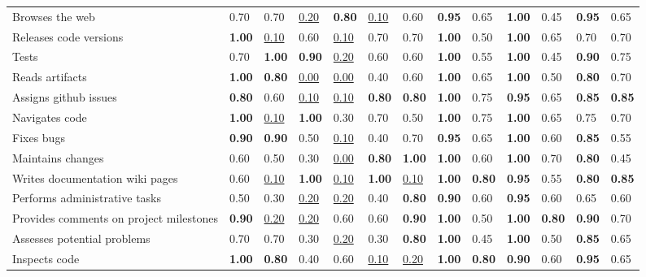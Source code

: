 \begin{tabular}{lllllllllllll}
Browses the web & 0.70 & 0.70 & \underline{0.20} & \textbf{0.80} & \underline{0.10} & 0.60 & \textbf{0.95} & 0.65 & \textbf{1.00} & 0.45 & \textbf{0.95} & 0.65 \\
Releases code versions & \textbf{1.00} & \underline{0.10} & 0.60 & \underline{0.10} & 0.70 & 0.70 & \textbf{1.00} & 0.50 & \textbf{1.00} & 0.65 & 0.70 & 0.70 \\
Tests & 0.70 & \textbf{1.00} & \textbf{0.90} & \underline{0.20} & 0.60 & 0.60 & \textbf{1.00} & 0.55 & \textbf{1.00} & 0.45 & \textbf{0.90} & 0.75 \\
Reads artifacts & \textbf{1.00} & \textbf{0.80} & \underline{0.00} & \underline{0.00} & 0.40 & 0.60 & \textbf{1.00} & 0.65 & \textbf{1.00} & 0.50 & \textbf{0.80} & 0.70 \\
Assigns github issues & \textbf{0.80} & 0.60 & \underline{0.10} & \underline{0.10} & \textbf{0.80} & \textbf{0.80} & \textbf{1.00} & 0.75 & \textbf{0.95} & 0.65 & \textbf{0.85} & \textbf{0.85} \\
Navigates code & \textbf{1.00} & \underline{0.10} & \textbf{1.00} & 0.30 & 0.70 & 0.50 & \textbf{1.00} & 0.75 & \textbf{1.00} & 0.65 & 0.75 & 0.70 \\
Fixes bugs & \textbf{0.90} & \textbf{0.90} & 0.50 & \underline{0.10} & 0.40 & 0.70 & \textbf{0.95} & 0.65 & \textbf{1.00} & 0.60 & \textbf{0.85} & 0.55 \\
Maintains changes & 0.60 & 0.50 & 0.30 & \underline{0.00} & \textbf{0.80} & \textbf{1.00} & \textbf{1.00} & 0.60 & \textbf{1.00} & 0.70 & \textbf{0.80} & 0.45 \\
Writes documentation wiki pages & 0.60 & \underline{0.10} & \textbf{1.00} & \underline{0.10} & \textbf{1.00} & \underline{0.10} & \textbf{1.00} & \textbf{0.80} & \textbf{0.95} & 0.55 & \textbf{0.80} & \textbf{0.85} \\
Performs administrative tasks & 0.50 & 0.30 & \underline{0.20} & \underline{0.20} & 0.40 & \textbf{0.80} & \textbf{0.90} & 0.60 & \textbf{0.95} & 0.60 & 0.65 & 0.60 \\
Provides comments on project milestones & \textbf{0.90} & \underline{0.20} & \underline{0.20} & 0.60 & 0.60 & \textbf{0.90} & \textbf{1.00} & 0.50 & \textbf{1.00} & \textbf{0.80} & \textbf{0.90} & 0.70 \\
Assesses potential problems & 0.70 & 0.70 & 0.30 & \underline{0.20} & 0.30 & \textbf{0.80} & \textbf{1.00} & 0.45 & \textbf{1.00} & 0.50 & \textbf{0.85} & 0.65 \\
Inspects code & \textbf{1.00} & \textbf{0.80} & 0.40 & 0.60 & \underline{0.10} & \underline{0.20} & \textbf{1.00} & \textbf{0.80} & \textbf{0.90} & 0.60 & \textbf{0.95} & 0.65 \\

\end{tabular}
